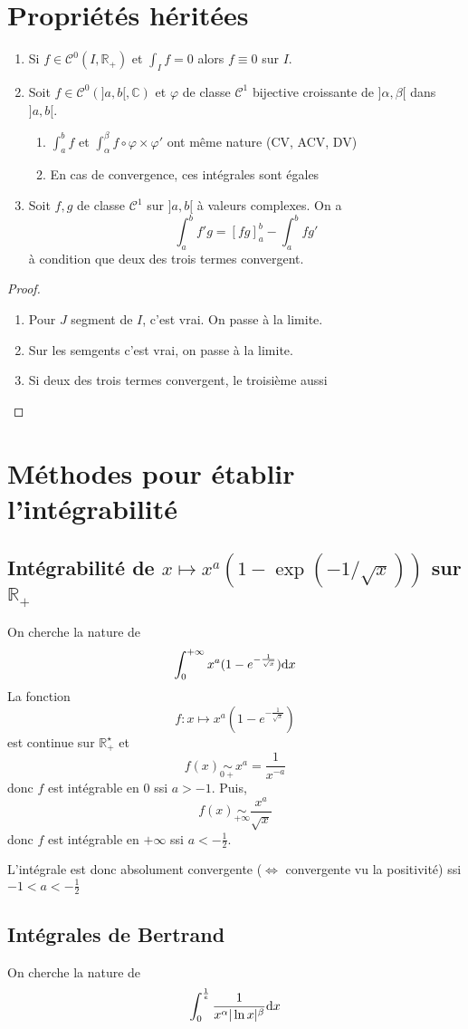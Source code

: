 \section{Propriétés héritées}

\begin{prop}
    \begin{enumerate}
        \item Si $f\in\mathcal C^0(I, \mathbb R_+)$ et $\int_If=0$ alors $f\equiv 0$ sur $I$.
        \item Soit $f\in\mathcal C^0(]a, b[, \mathbb C)$ et $\varphi$ de classe $\mathcal C^1$ bijective croissante de $]\alpha, \beta[$ dans $]a, b[$. \begin{enumerate}
            \item $\int_a^bf$ et $\int_\alpha^\beta f\circ \varphi\times \varphi'$ ont même nature (CV, ACV, DV)
            \item En cas de convergence, ces intégrales sont égales
        \end{enumerate}
    \item Soit $f, g$ de classe $\mathcal C^1$ sur $]a, b[$ à valeurs complexes. On a \[
            \int_a^bf'g=[fg]_a^b-\int_a^bfg'
        \]
        à condition que deux des trois termes convergent.
    \end{enumerate}
\end{prop}

\begin{proof}~
    \begin{enumerate}
        \item Pour $J$ segment de $I$, c'est vrai. On passe à la limite.
        \item Sur les semgents c'est vrai, on passe à la limite.
        \item Si deux des trois termes convergent, le troisième aussi
    \end{enumerate}
\end{proof}

\section{Méthodes pour établir l'intégrabilité}

\subsection{Intégrabilité de $x\longmapsto x^a(1-\exp(-1/\sqrt x))$ sur $\mathbb R_+$}

On cherche la nature de \[
    \int_0^{+\infty} x^a(1-e^{-\frac1{\sqrt x}})\mathrm{d} x
\]
La fonction \[
    f:x\longmapsto x^a(1-e^{-\frac1{\sqrt x}})
\]
est continue sur $\mathbb R_+^\star$ et \[
    f(x)\underset{0+}\sim x^a=\frac1{x^{-a}}
\]
donc $f$ est intégrable en $0$ ssi $a>-1$. Puis, \[
    f(x)\underset{+\infty}\sim\frac{x^a}{\sqrt x}
\]
donc $f$ est intégrable en $+\infty$ ssi $a<-\frac12$.

L'intégrale est donc absolument convergente ($\iff$ convergente vu la positivité) ssi $-1<a<-\frac12$

\subsection{Intégrales de Bertrand}


On cherche la nature de \[
    \int_0^{\frac1e}\frac1{x^\alpha|\ln x|^\beta}\mathrm{d} x
\]

